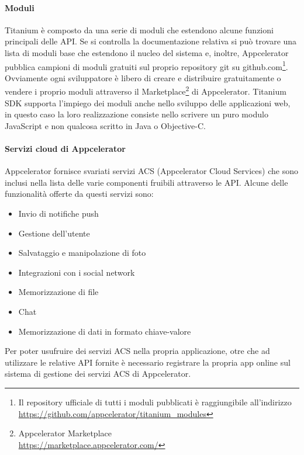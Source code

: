 			\paragraph{Moduli}
				Titanium è composto da una serie di moduli che estendono alcune 
				funzioni principali delle API. Se si controlla la documentazione 
				relativa si può trovare una lista di moduli base che estendono 
				il nucleo del sistema e, inoltre, Appcelerator pubblica 
				campioni di moduli gratuiti sul proprio repository git su 
				\mbox{github.com}\footnote{Il repository ufficiale di tutti i 
				moduli pubblicati è	raggiungibile all'indirizzo\\
				\url{https://github.com/appcelerator/titanium_modules}}. 
				Ovviamente ogni sviluppatore è libero di creare e distribuire 
				gratuitamente o vendere i proprio moduli attraverso il 
				Marketplace\footnote{Appcelerator Marketplace\\
				\url{https://marketplace.appcelerator.com/}} 
				di Appcelerator. Titanium SDK supporta l'impiego dei moduli 
				anche nello sviluppo delle applicazioni web, in questo caso la 
				loro realizzazione consiste nello scrivere un puro modulo 
				JavaScript e non qualcosa scritto in Java o Objective-C.
			
			\clearpage
			\paragraph{Servizi cloud di Appcelerator}
				Appcelerator fornisce svariati servizi ACS (Appcelerator Cloud 
				Services) che sono inclusi nella lista delle varie componenti 
				fruibili attraverso le API. Alcune delle funzionalità offerte da 
				questi servizi sono:
				\begin{itemize}
					\item Invio di notifiche push
					\item Gestione dell'utente
					\item Salvataggio e manipolazione di foto
					\item Integrazioni con i social network
					\item Memorizzazione di file
					\item Chat
					\item Memorizzazione di dati in formato chiave-valore
				\end{itemize}
				Per poter usufruire dei servizi ACS nella propria applicazione, 
				otre che ad utilizzare le relative API fornite è necessario 
				registrare la propria app online sul sistema di gestione dei 
				servizi ACS di Appcelerator.
			

